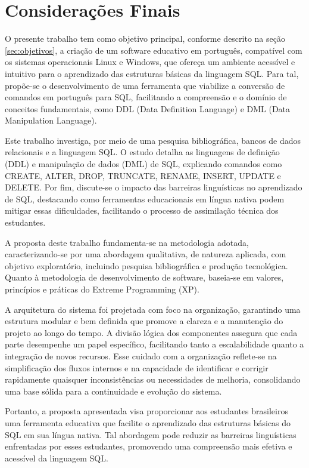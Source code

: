 \chapter[Considerações]{Considerações Finais}
\label{sec:considerações}


O presente trabalho tem como objetivo principal, conforme descrito na seção \ref{sec:objetivos}, a criação de um software educativo em português, compatível com os sistemas operacionais Linux e Windows, que ofereça um ambiente acessível e intuitivo para o aprendizado das estruturas básicas da linguagem SQL. Para tal, propõe-se o desenvolvimento de uma ferramenta que viabilize a conversão de comandos em português para SQL, facilitando a compreensão e o domínio de conceitos fundamentais, como DDL (Data Definition Language) e DML (Data Manipulation Language).

Este trabalho investiga, por meio de uma pesquisa bibliográfica, bancos de dados relacionais e a linguagem SQL. O estudo detalha as linguagens de definição (DDL) e manipulação de dados (DML) de SQL, explicando comandos como CREATE, ALTER, DROP, TRUNCATE, RENAME, INSERT, UPDATE e DELETE. Por fim, discute-se o impacto das barreiras linguísticas no aprendizado de SQL, destacando como ferramentas educacionais em língua nativa podem mitigar essas dificuldades, facilitando o processo de assimilação técnica dos estudantes.

A proposta deste trabalho fundamenta-se na metodologia adotada, caracterizando-se por uma abordagem qualitativa, de natureza aplicada, com objetivo exploratório, incluindo pesquisa bibliográfica e produção tecnológica. Quanto à metodologia de desenvolvimento de software, baseia-se em valores, princípios e práticas do Extreme Programming (XP).

A arquitetura do sistema foi projetada com foco na organização, garantindo uma estrutura modular e bem definida que promove a clareza e a manutenção do projeto ao longo do tempo. A divisão lógica dos componentes assegura que cada parte desempenhe um papel específico, facilitando tanto a escalabilidade quanto a integração de novos recursos. Esse cuidado com a organização reflete-se na simplificação dos fluxos internos e na capacidade de identificar e corrigir rapidamente quaisquer inconsistências ou necessidades de melhoria, consolidando uma base sólida para a continuidade e evolução do sistema.

Portanto, a proposta apresentada visa proporcionar aos estudantes brasileiros uma ferramenta educativa que facilite o aprendizado das estruturas básicas do SQL em sua língua nativa. Tal abordagem pode reduzir as barreiras linguísticas enfrentadas por esses estudantes, promovendo uma compreensão mais efetiva e acessível da linguagem SQL.